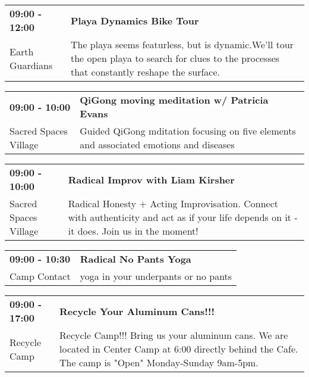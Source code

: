 \begin{tabular}{ p{1in} p{2.2in} }
    \textbf{09:00 - 12:00} & \textbf{Playa Dynamics Bike Tour} \\
    Earth Guardians \newline  & The playa seems featurless, but is dynamic.We'll tour the open playa to search for clues to the processes that constantly reshape the surface. \\
    \hline 
\end{tabular}
    
\begin{tabular}{ p{1in} p{2.2in} }
    \textbf{09:00 - 10:00} & \textbf{QiGong moving meditation w/ Patricia Evans} \\
    Sacred Spaces Village \newline  & Guided QiGong mditation focusing on five elements and associated emotions and diseases \\
    \hline 
\end{tabular}
    
\begin{tabular}{ p{1in} p{2.2in} }
    \textbf{09:00 - 10:00} & \textbf{Radical Improv with Liam Kirsher} \\
    Sacred Spaces Village \newline  & Radical Honesty + Acting Improvisation. Connect with authenticity and act as if your life depends on it - it does. Join us in the moment! \\
    \hline 
\end{tabular}
    
\begin{tabular}{ p{1in} p{2.2in} }
    \textbf{09:00 - 10:30} & \textbf{Radical No Pants Yoga} \\
    Camp Contact \newline  & yoga in your underpants or no pants \\
    \hline 
\end{tabular}
    
\begin{tabular}{ p{1in} p{2.2in} }
    \textbf{09:00 - 17:00} & \textbf{Recycle Your Aluminum Cans!!!} \\
    Recycle Camp \newline  & Recycle Camp!!! Bring us your aluminum cans. We are located in Center Camp at 6:00 directly behind the Cafe. The camp is "Open" Monday-Sunday 9am-5pm. \\
    \hline 
\end{tabular}
    
